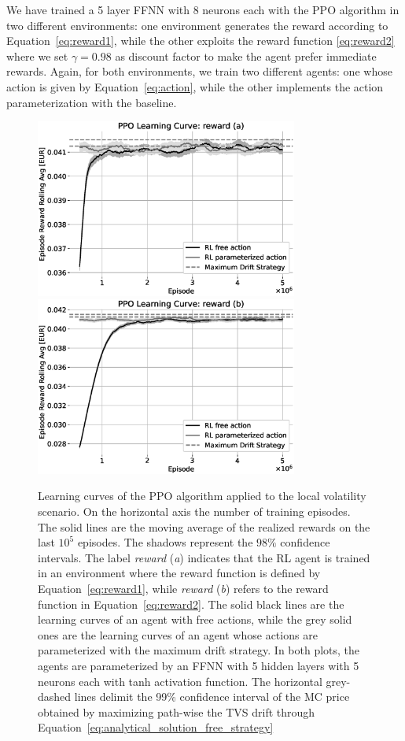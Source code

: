 \documentclass[runningheads]{m2ef}
\newcommand{\change}[1]{{\color{red} {#1}}}%
\begin{document}
We have trained a 5 layer FFNN with 8 neurons each with the PPO algorithm in two different environments: one environment generates the reward according to Equation~\eqref{eq:reward1}, while the other exploits the reward function \eqref{eq:reward2} where we set $\gamma=0.98$ as discount factor to make the agent prefer immediate rewards. Again, for both environments, we train two different agents: one whose action is given by Equation~\eqref{eq:action}, while the other implements the action parameterization with the baseline.
\begin{figure}[h!]
	\centering
	\includegraphics[width=3.4in]{LV_PPO_reward_a_learning_curve.eps}
	\includegraphics[width=3.4in]{LV_PPO_reward_b_learning_curve.eps}
	\caption{Learning curves of the PPO algorithm applied to the local volatility \change{scenario}. On the horizontal axis the number of training episodes. The solid lines are the moving average of the realized rewards on the last $10^5$ episodes. The shadows represent the $98\%$ confidence intervals. The label {\it reward} ({\it a}) indicates that the RL agent is trained in an environment where the reward function is defined by Equation~\eqref{eq:reward1}, while {\it reward} ({\it b}) refers to the reward function in Equation~\eqref{eq:reward2}. The solid black lines are the learning curves of an agent with free actions, while the grey solid ones are the learning curves of an agent whose actions are parameterized with the maximum drift strategy. In both plots, the agents are parameterized by an FFNN with 5 hidden layers with 5 neurons each with tanh activation function. The horizontal grey-dashed lines delimit the 99\% confidence interval of the MC price obtained by maximizing path-wise the TVS drift through Equation~\eqref{eq:analytical_solution_free_strategy}}\label{fig:PPO_results}
\end{figure}
\end{document}
